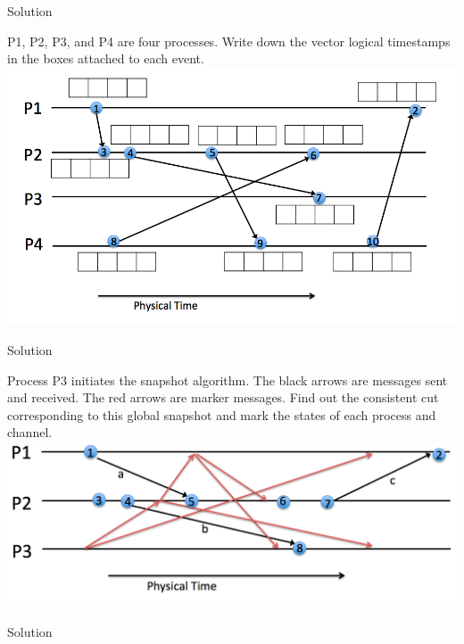 \documentclass{article}
\begin{document}
\begin{spacing}{1.1}
\begin{homeworkProblem}
\begin{enumerate}[(1)]
\begin{homeworkSection}{Solution}
			\end{homeworkSection}
	\end{enumerate}
\end{homeworkProblem}
\newpage	
\begin{homeworkProblem}
	P1, P2, P3, and P4 are four processes. Write down the vector logical timestamps in the boxes attached to each event.
	\\ \includegraphics[width=\linewidth]{prob3.png}
	\begin{homeworkSection}{Solution}
		
	\end{homeworkSection}
\end{homeworkProblem}
\newpage
\begin{homeworkProblem}
	Process P3 initiates the snapshot algorithm. The black arrows are messages sent and received. The red arrows are marker messages. Find out the consistent cut corresponding to this global snapshot and mark the states of each process and channel.
	\\ \includegraphics[width=\linewidth]{prob4.png}
	\begin{homeworkSection}{Solution}
		

\end{homeworkSection}
\end{homeworkProblem}
\end{spacing}
\end{document}
